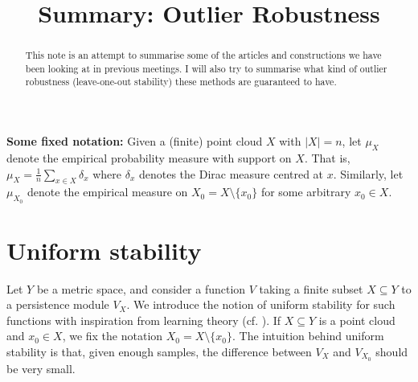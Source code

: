 \documentclass[10pt,a4paper]{article}
\title{Summary: Outlier Robustness}
\theoremstyle{definition}
\newcommand{\R}{\mathbb{R}}
\begin{document}
\maketitle


\begin{abstract}
	This note is an attempt to summarise some of the articles and constructions we have been looking at in previous meetings. I will also try to summarise what kind of outlier robustness (leave-one-out stability) these methods are guaranteed to have.
\end{abstract}

\textbf{Some fixed notation:} Given a (finite) point cloud $X$ with $|X|=n$, let $\mu_X$ denote the empirical probability measure with support on $X$. That is, $\mu_X = \frac{1}{n}\sum_{x\in X}\delta_x$ where $\delta_x$ denotes the Dirac measure centred at $x$. Similarly, let $\mu_{X_0}$ denote the empirical measure on $X_0 = X\setminus\{x_0\}$ for some arbitrary $x_0\in X$. 


\section{Uniform stability}
Let $Y$ be a metric space, and consider a function $V$ taking a finite subset $X\subseteq Y$ to a persistence module $V_X$. We introduce the notion of uniform stability for such functions with inspiration from learning theory (cf. \cite{bousquet2002stability}). If $X\subseteq Y$ is a point cloud and $x_0\in X$, we fix the notation $X_0 = X\setminus\{x_0\}$. The intuition behind uniform stability is that, given enough samples, the difference between $V_X$ and $V_{X_0}$ should be very small.
\end{document}

